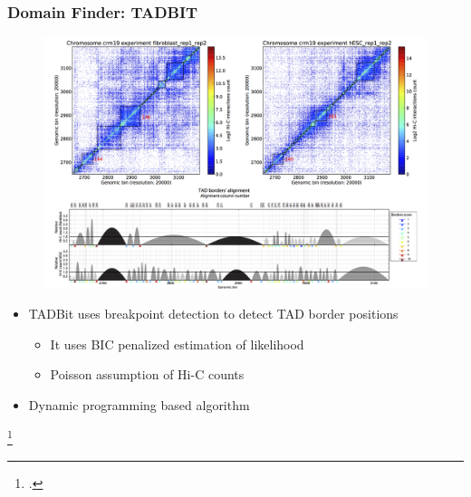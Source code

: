 \documentclass[12pt]{beamer}
\begin{document}
\begin{frame}
\frametitle{Domain Finder: TADBIT}

\begin{figure}
\includegraphics[scale=0.5]{tadbit.png}
\end{figure}

\begin{itemize}
\item TADBit uses breakpoint detection to detect TAD border positions
\begin{itemize}
\item It uses BIC penalized estimation of likelihood
\vspace{0.1cm}
\item Poisson assumption of Hi-C counts
\end{itemize}
\vspace{0.1cm}
\item Dynamic programming based algorithm
\end{itemize}

\footcitetext{tadbit}

\end{frame}
\end{document}
